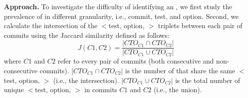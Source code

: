 \noindent \textbf{Approach.}
To investigate the difficulty of identifying an \inconsistent, we first study the prevalence of \inconsistent in different granularity, i.e., commit, test, and option. 
Second, we calculate the intersection of the $<$test, option, \inconsistent$>$ triplets between each pair of commits %
using the Jaccard similarity defined as follows:
\begin{equation}
J(C1,C2) = \frac{|CTO_{C1} \cap CTO_{C2}|}{|CTO_{C1} \cup CTO_{C2}|}
\end{equation} 
where $C1$ and $C2$ refer to every pair of commits (both consecutive and non-consecutive commits). $|CTO_{C1} \cap CTO_{C2}|$ is the number of \instance that share the same $<$test, option, \inconsistent$>$ (i.e., the intersection). $|CTO_{C1} \cup CTO_{C2}|$ is the total number of unique $<$test, option, \inconsistent$>$ in commits $C1$ and $C2$ (i.e., the union). %
